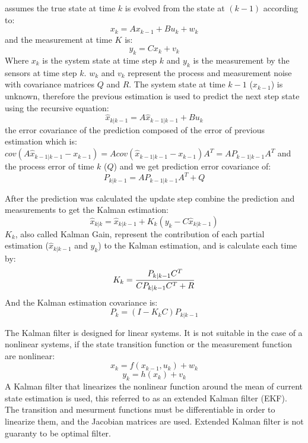 \documentclass[ twoside, 12pt ]{article}
\begin{document}
assumes the true state at time $k$ is evolved from the state at $(k-1)$ according to:
$$x_{k}=Ax_{k-1} + Bu_{k} + w_{k}$$
and the measurement at time $K$ is:
$$y_k=Cx_k+v_k$$
Where $x_k$ is the system state at time step $k$ and $y_k$ is the measurement by the sensors at time step $k$.
$w_k$ and $v_k$ represent the process and measurement noise with covariance matrices $Q$ and $R$.
The system state at time $k-1$ ($x_{k-1}$) is unknown, therefore the previous estimation is used to predict the next step state using the recursive equation:
$$ \hat{x}_{k|k-1}=A\hat{x}_{k-1|k-1} + Bu_{k} $$
the error covariance of the prediction composed of the error of previous estimation which is:
$cov(A\hat{x}_{k-1|k-1} - x_{k-1}) = A cov(\hat{x}_{k-1|k-1} - x_{k-1}) A^T=A P_{k-1|k-1} A^T$
and the process error of time $k$ ($Q$) and we get prediction error covariance of:
$$ P_{k|k-1} = A P_{k-1|k-1} A^T + Q $$

After the prediction was calculated the update step combine the prediction and measurements to get the Kalman estimation:
$$ \hat{x}_{k|k} = \hat{x}_{k|k-1} + K_k(y_k - C\hat{x}_{k|k-1})$$
$K_k$, also called Kalman Gain, represent the contribution of each partial estimation ($\hat{x}_{k|k-1}$ and $y_k$) to the Kalman estimation, and is calculate each time by:
$$ K_k = {{P_{k|k-1} C^T} \over {C P_{k|k-1} C^T + R} }$$
And the Kalman estimation covariance is:
$$ P_k = (I - K_kC) P_{k|k-1} $$

The Kalman filter is designed for linear systems. It is not suitable in the case of a nonlinear systems, if the state transition function or the measurement function are nonlinear:
$$x_{k}=f(x_{k-1} , u_{k}) + w_{k}$$
$$y_k=h(x_k) + v_k$$
A Kalman filter that linearizes the nonlinear function around the mean of current state estimation is used, this referred to as an extended Kalman filter (EKF).
The transition and mesurment functions must be differentiable in order to linearize them, and the Jacobian matrices are used.
Extended Kalman filter is not guaranty to be optimal filter.

\end{document}
